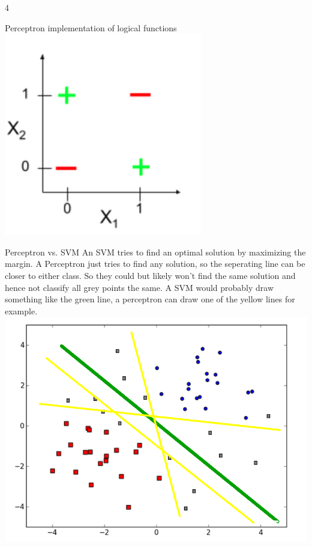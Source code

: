 \documentclass{article}
\begin{document}
\begin{ukon-infie}[22.11.17]{4}
\begin{exercise}[p=11]{Perceptron implementation of logical functions}
{        	\includegraphics[scale=0.5]{perceptron_XOR}
        	}
		
		\end{exercise}
		
		\begin{exercise}[p=4]{Perceptron vs. SVM}
		An SVM tries to find an optimal solution by maximizing the margin. A Perceptron just tries to find any solution, so the seperating line can be closer to either class. So they could but likely won't find the same solution and hence not classify all grey points the same. A SVM would probably draw something like the green line, a perceptron can draw one of the yellow lines for example.\\
		\includegraphics[scale=0.5]{points.png}
		
		\end{exercise}
		

\end{ukon-infie}
\end{document}

